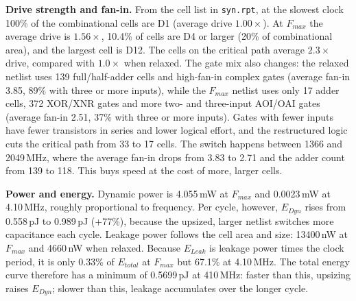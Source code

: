 \documentclass[11pt]{article}
\begin{document}
\textbf{Drive strength and fan-in.} From the cell list in \texttt{syn.rpt}, at the slowest clock 100\% of the combinational cells are D1 (average drive $1.00\times$). At $F_{max}$ the average drive is $1.56\times$, 10.4\% of cells are D4 or larger (20\% of combinational area), and the largest cell is D12. The cells on the critical path average $2.3\times$ drive, compared with $1.0\times$ when relaxed. The gate mix also changes: the relaxed netlist uses 139 full/half-adder cells and high-fan-in complex gates (average fan-in 3.85, 89\% with three or more inputs), while the $F_{max}$ netlist uses only 17 adder cells, 372 XOR/XNR gates and more two- and three-input AOI/OAI gates (average fan-in 2.51, 37\% with three or more inputs). Gates with fewer inputs have fewer transistors in series and lower logical effort, and the restructured logic cuts the critical path from 33 to 17 cells. The switch happens between 1366 and 2049\,MHz, where the average fan-in drops from 3.83 to 2.71 and the adder count from 139 to 118. This buys speed at the cost of more, larger cells.

\textbf{Power and energy.} Dynamic power is 4.055\,mW at $F_{max}$ and 0.0023\,mW at 4.10\,MHz, roughly proportional to frequency. Per cycle, however, $E_{Dyn}$ rises from 0.558\,pJ to 0.989\,pJ (+77\%), because the upsized, larger netlist switches more capacitance each cycle. Leakage power follows the cell area and size: 13400\,nW at $F_{max}$ and 4660\,nW when relaxed. Because $E_{Leak}$ is leakage power times the clock period, it is only 0.33\% of $E_{total}$ at $F_{max}$ but 67.1\% at 4.10\,MHz. The total energy curve therefore has a minimum of 0.5699\,pJ at 410\,MHz: faster than this, upsizing raises $E_{Dyn}$; slower than this, leakage accumulates over the longer cycle.
\end{document}
